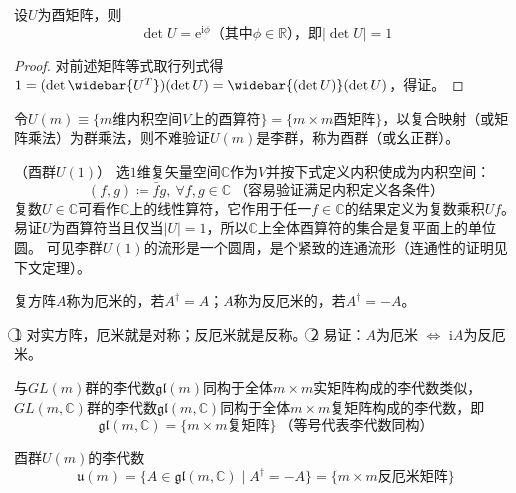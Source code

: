 \begin{theorem}
    设$U$为酉矩阵，则
    $$\det U = \mathrm{e}^{\mathrm{i}\phi} \text{（其中$\phi \in \mathbb{R}$），即$|\det U| = 1$}$$
\end{theorem}

\begin{proof}
    对前述矩阵等式取行列式得$1 = (\det \widebar{U^T})(\det U) = \widebar{(\det U)}(\det U)$，得证。
\end{proof}

\begin{definition}
    令$U(m) \equiv \{\text{$m$维内积空间$V$上的酉算符}\} = \{m \times m \text{酉矩阵}\}$，以复合映射（或矩阵乘法）为群乘法，则不难验证$U(m)$是李群，称为酉群（或幺正群）。
\end{definition}

\begin{example}
    （酉群$U(1)$） 选$1$维复矢量空间$\mathbb{C}$作为$V$并按下式定义内积使成为内积空间：
    $$(f, g) \coloneq \bar fg, ~ \forall f, g \in \mathbb{C} ~ \text{（容易验证满足内积定义各条件）}$$
    复数$U \in \mathbb{C}$可看作$\mathbb{C}$上的线性算符，它作用于任一$f \in \mathbb{C}$的结果定义为复数乘积$Uf$。
    易证$U$为酉算符当且仅当$|U| = 1$，所以$\mathbb{C}$上全体酉算符的集合是复平面上的单位圆。
    可见李群$U(1)$的流形是一个圆周，是个紧致的连通流形（连通性的证明见下文定理）。
\end{example}

\begin{definition}
    复方阵$A$称为厄米的，若$A^\dagger = A$；$A$称为反厄米的，若$A^\dagger = -A$。
\end{definition}

\begin{note}
    \textcircled{1} 对实方阵，厄米就是对称；反厄米就是反称。
    \textcircled{2} 易证：$A$为厄米 $\Leftrightarrow$ $\mathrm{i}A$为反厄米。
\end{note}

与$GL(m)$群的李代数$\mathfrak{gl}(m)$同构于全体$m \times m$实矩阵构成的李代数类似，$GL(m, \mathbb{C})$群的李代数$\mathfrak{gl}(m, \mathbb{C})$同构于全体$m \times m$复矩阵构成的李代数，即
$$\mathfrak{gl}(m, \mathbb{C}) = \{m \times m \text{复矩阵}\} ~ \text{（等号代表李代数同构）}$$

\begin{theorem}
    酉群$U(m)$的李代数
    $$\mathfrak{u}(m) = \{A \in \mathfrak{gl}(m, \mathbb{C}) \mid A^\dagger = -A\} = \{m \times m \text{反厄米矩阵}\}$$
\end{theorem}

